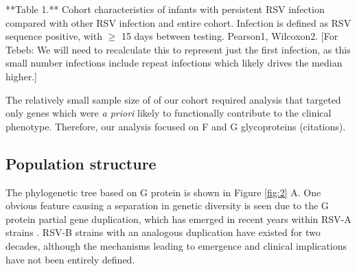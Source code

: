 \documentclass{article}
\begin{document}
**Table 1.** Cohort characteristics of infants with persistent RSV infection compared with other RSV infection and entire cohort. Infection is defined as RSV sequence positive, with $\ge$ 15 days between testing. Pearson1, Wilcoxon2.
[For Tebeb: We will need to recalculate this to represent just the first infection, as this small number infections include repeat infections which likely drives the median higher.]

The relatively small sample size of of our cohort required analysis that targeted only genes which were \textit{a priori} likely to functionally contribute to the clinical phenotype. 
Therefore, our analysis focused on F and G glycoproteins (citations).

\subsection{Population structure}
The phylogenetic tree based on G protein is shown in 
Figure \ref{fig:2} A.
One obvious feature causing a separation in genetic diversity is seen due to the G protein partial gene duplication, 
which has emerged in recent years within RSV-A strains 
\cite{eshaghi2012genetic}.
RSV-B strains with an analogous duplication have existed for two decades, 
although the mechanisms leading to emergence and clinical implications have not been entirely defined.
\end{document}
